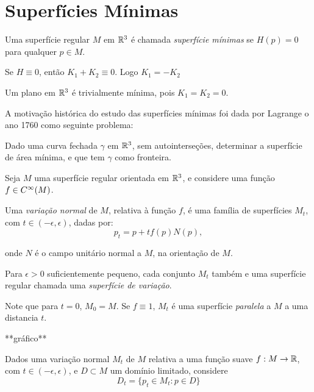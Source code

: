 \section{Superfícies Mínimas}

\begin{defi}
	Uma superfície regular $M$ em $\mathbb{R}^3$ é chamada \emph{superfície mínimas} se $H(p)=0$ para qualquer $p \in M$.
\end{defi}

\begin{obse}
	Se $H \equiv 0$, então $K_1 + K_2 \equiv 0$. Logo $K_1 = -K_2$
\end{obse}

\begin{exemplo}
	Um plano em $\mathbb{R}^3$ é trivialmente mínima, pois $K_1=K_2=0$.
\end{exemplo}

A motivação histórica do estudo das superfícies mínimas foi dada por Lagrange o ano 1760 como seguinte problema:

Dado uma curva fechada $\gamma$ em $\mathbb{R}^3$, sem autointerseções, determinar a superfície de área mínima, e que tem $\gamma$ como fronteira.

Seja $M$ uma superfície regular orientada em $\mathbb{R}^3$, e considere uma função $f \in C^{\infty}(M)$.

\begin{defi}
	Uma \emph{variação normal} de $M$, relativa à função $f$, é uma família de superfícies $M_t$, com $t \in (-\epsilon,\epsilon)$, dadas por:
	\begin{equation*}
		p_t = p + t f(p) N(p),
	\end{equation*}
	
	onde $N$ é o campo unitário normal a $M$, na orientação de $M$.
	
\end{defi}

Para $\epsilon > 0$ suficientemente pequeno, cada conjunto $M_t$ também e uma superfície regular chamada uma \emph{superfície de variação}.

Note que para $t=0$, $M_0=M$. Se $f \equiv 1$, $M_t$ é uma superfície \emph{paralela} a $M$ a uma distancia $t$.

**gráfico**

Dados uma variação normal $M_t$ de $M$ relativa a uma função suave $f: M \rightarrow \mathbb{R}$, com $t \in (-\epsilon,\epsilon)$, e $D \subset M$ um domínio limitado, considere
\begin{equation*}
	D_t = \{ p_t \in M_t: p \in D \}
\end{equation*}

